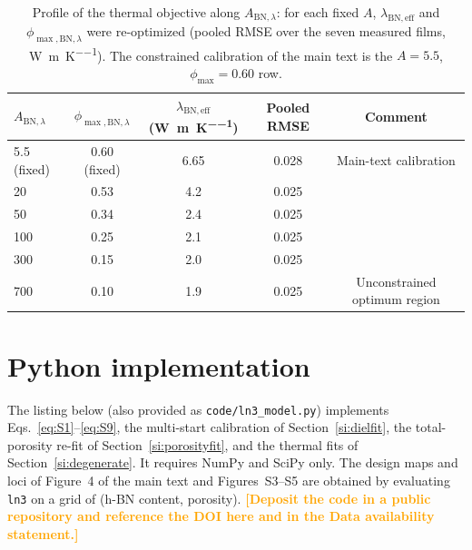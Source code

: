 \documentclass[10pt,a4paper]{article}
\newcommand{\hl}[1]{\textcolor{orange}{\textbf{[#1]}}}
\newcommand{\lamBN}{\ensuremath{\lambda_{\mathrm{BN,eff}}}}
\newcommand{\phimax}{\ensuremath{\phi_{\max}}}
\begin{document}
\begin{table}[htbp]
\centering
\caption{Profile of the thermal objective along $A_{\mathrm{BN},\lambda}$: for each fixed $A$, $\lamBN$ and $\phi_{\max,\mathrm{BN},\lambda}$ were re-optimized (pooled RMSE over the seven measured films, \si{\watt\per\meter\per\kelvin}). The constrained calibration of the main text is the $A = 5.5$, $\phimax = 0.60$ row.}
\label{tab:S7}
\small
\begin{tabular}{@{}lcccc@{}}
\toprule
$A_{\mathrm{BN},\lambda}$ & $\phi_{\max,\mathrm{BN},\lambda}$ & $\lamBN$ (\si{\watt\per\meter\per\kelvin}) & Pooled RMSE & Comment \\
\midrule
5.5 (fixed) & 0.60 (fixed) & 6.65 & 0.028 & Main-text calibration \\
20  & 0.53 & 4.2 & 0.025 & \\
50  & 0.34 & 2.4 & 0.025 & \\
100 & 0.25 & 2.1 & 0.025 & \\
300 & 0.15 & 2.0 & 0.025 & \\
700 & 0.10 & 1.9 & 0.025 & Unconstrained optimum region \\
\bottomrule
\end{tabular}
\end{table}

\section{Python implementation}
\label{si:code}
The listing below (also provided as \texttt{code/ln3\_model.py}) implements Eqs.~\ref{eq:S1}--\ref{eq:S9}, the multi-start calibration of Section~\ref{si:dielfit}, the total-porosity re-fit of Section~\ref{si:porosityfit}, and the thermal fits of Section~\ref{si:degenerate}. It requires NumPy and SciPy only. The design maps and loci of Figure~4 of the main text and Figures~S3--S5 are obtained by evaluating \texttt{ln3} on a grid of (h-BN content, porosity). \hl{Deposit the code in a public repository and reference the DOI here and in the Data availability statement.}


\end{document}
